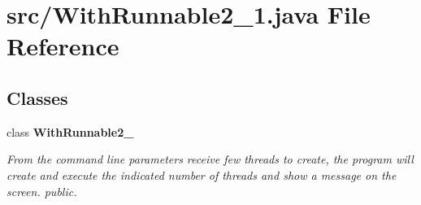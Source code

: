\section{src/\+With\+Runnable2\+\_\+1.java File Reference}
\label{_with_runnable2__1_8java}
\subsection*{Classes}
\begin{DoxyCompactItemize}
\item 
class {\bf With\+Runnable2\+\_}
\begin{DoxyCompactList}\small\item\em From the command line parameters receive few threads to create, the program will create and execute the indicated number of threads and show a message on the screen.  public. \end{DoxyCompactList}\end{DoxyCompactItemize}
